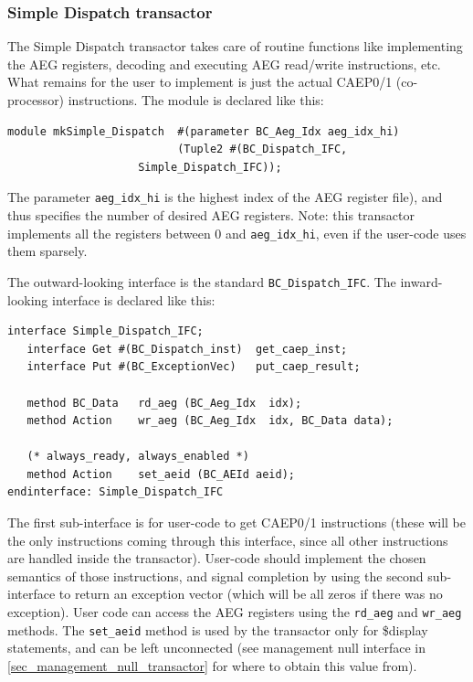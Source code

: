 \documentclass[twoside,letterpaper,11pt]{article}
\begin{document}

\subsubsection{Simple Dispatch transactor}

\label{sec_simple_dispatch_transactor}

The Simple Dispatch transactor takes care of routine functions like
implementing the AEG registers, decoding and executing AEG read/write
instructions, etc.  What remains for the user to implement is just the
actual CAEP0/1 (co-processor) instructions.  The module is declared
like this:
\begin{Verbatim}[frame=single, label=BC\_Transactors.bsv]
module mkSimple_Dispatch  #(parameter BC_Aeg_Idx aeg_idx_hi)
                          (Tuple2 #(BC_Dispatch_IFC,
				    Simple_Dispatch_IFC));
\end{Verbatim} 
The parameter \verb|aeg_idx_hi| is the highest index of the AEG
register file), and thus specifies the number of desired AEG
registers.  Note: this transactor implements all the registers between
0 and \verb|aeg_idx_hi|, even if the user-code uses them sparsely.

The outward-looking interface is the standard
\verb|BC_Dispatch_IFC|.  The inward-looking interface is declared
like this:
\begin{Verbatim}[frame=single, label=BC\_Transactors.bsv]
interface Simple_Dispatch_IFC;
   interface Get #(BC_Dispatch_inst)  get_caep_inst;
   interface Put #(BC_ExceptionVec)   put_caep_result;

   method BC_Data   rd_aeg (BC_Aeg_Idx  idx);
   method Action    wr_aeg (BC_Aeg_Idx  idx, BC_Data data);

   (* always_ready, always_enabled *)
   method Action    set_aeid (BC_AEId aeid);
endinterface: Simple_Dispatch_IFC
\end{Verbatim}
The first sub-interface is for user-code to get CAEP0/1 instructions
(these will be the only instructions coming through this interface,
since all other instructions are handled inside the transactor).
User-code should implement the chosen semantics of those instructions,
and signal completion by using the second sub-interface to return an
exception vector (which will be all zeros if there was no exception).
User code can access the AEG registers using the \verb|rd_aeg| and
\verb|wr_aeg| methods.  The \verb|set_aeid| method is used by the
transactor only for \$display statements, and can be left unconnected
(see management null interface in \ref{sec_management_null_transactor}
for where to obtain this value from).
\end{document}
